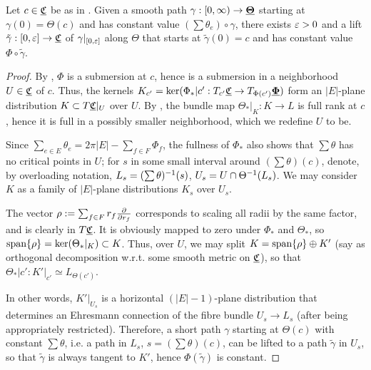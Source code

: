 \begin{prop}
\label{p:nghd_lift}
Let $c\in {\underline{\mathfrak{C}}}$ be as in .
Given a smooth path $\gamma: [0,\infty) \to {\underline{\mathbf{\Theta}}}$
starting at $\gamma(0) = \Theta(c)$
and has constant value $(\sum \theta_e) \circ \gamma$,
there exists $\varepsilon > 0$ and a lift $\tilde{\gamma} :[0, \varepsilon] \to {\underline{\mathfrak{C}}}$
of $\gamma|_{[0,\varepsilon]}$ along $\Theta$
that starts at $\tilde{\gamma}(0) = c$
and has constant value $\Phi \circ \tilde{\gamma}$.
\end{prop}


\begin{proof}
By , $\Phi$ is a submersion at $c$,
hence is a submersion in a neighborhood $U \in {\underline{\mathfrak{C}}}$ of $c$.
Thus, the kernels
$K_{c'} = \ker(\Phi_*|{c'} : T_{c'} {\underline{\mathfrak{C}}} \to T_{\Phi(c')} {\underline{\mathbf{\Phi}}})$
form an $|E|$-plane distribution $K \subset T{\underline{\mathfrak{C}}}|_U$ over $U$.
By , the bundle map
$\Theta_*|_K : K \to L$ is full rank at $c$,
hence it is full in a possibly smaller neighborhood,
which we redefine $U$ to be.


Since $\sum_{e \in E} \theta_e = 2\pi |E| - \sum_{f\in F} \Phi_f$,
the fullness of $\Phi_*$ also shows that
$\sum \theta$ has no critical points in $U$;
for $s$ in some small interval around $(\sum \theta)(c)$,
denote, by overloading notation,
$L_s = (\sum \theta)^{-1} (s)$,
$U_s = U \cap \Theta^{-1}(L_s)$.
We may consider $K$ as a family of $|E|$-plane distributions
$K_s$ over $U_s$.


The vector $\rho := \sum_{f\in F} r_f {\frac{\partial}{\partial r_f}}$ corresponds to
scaling all radii by the same factor, and is clearly in $T{\underline{\mathfrak{C}}}$.
It is obviously mapped to zero under $\Phi_*$ and $\Theta_*$,
so ${\text{span}}\{\rho\} = \ker(\Theta_*|_K) \subset K$.
Thus, over $U$, we may split
$K = {\text{span}}\{\rho\} \oplus K'$
(say as orthogonal decomposition w.r.t. some smooth metric on ${\underline{\mathfrak{C}}}$),
so that $\Theta_*|{c'} : K'|_{c'} \simeq L_{\Theta(c')}$.


In other words, $K'|_{U_s}$ is a horizontal $(|E|-1)$-plane distribution
that determines an Ehresmann connection of the
fibre bundle $U_s \to L_s$ (after being appropriately restricted).
Therefore, a short path $\gamma$ starting at $\Theta(c)$
with constant $\sum \theta$, i.e. a path in $L_s$, $s ={(\sum \theta)(c)}$,
can be lifted to a path $\tilde{\gamma}$ in $U_s$,
so that $\tilde{\gamma}$ is always tangent to $K'$,
hence $\Phi(\tilde{\gamma})$ is constant.
\end{proof}


